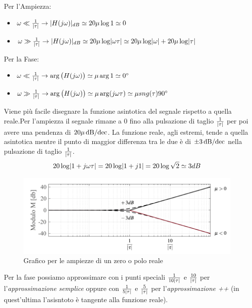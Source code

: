 Per l'Ampiezza:
\begin{itemize}
	\item $ \omega \ll \frac{1}{\abs{\tau}} \rightarrow \abs{H(j\omega)}_{dB} \simeq 20\mu \log 1 \simeq 0 $
	\item $ \omega \gg \frac{1}{\abs{\tau}} \rightarrow \abs{H(j\omega)}_{dB} \simeq 20\mu \log \abs{\omega\tau} \simeq 20 \mu \log \abs{\omega} +20 \mu \log \abs{\tau} $
\end{itemize}

Per la Fase:
\begin{itemize}
	\item $ \omega \ll \frac{1}{\abs{\tau}} \rightarrow \arg \big(H(j\omega)\big) \simeq \mu \arg 1 \simeq \ang{0} $ 
	\item $ \omega \gg \frac{1}{\abs{\tau}} \rightarrow \arg \big(H(j\omega)\big) \simeq \mu \arg (j\omega\tau) \simeq \mu \sng(\tau)\ang{90} $ 
\end{itemize}

Viene più facile disegnare la funzione asintotica del segnale rispetto a quella reale.Per l'ampiezza il segnale rimane a $ 0 $ fino alla pulsazione di taglio $ \frac{1}{\abs{\tau}} $ per poi avere una pendenza di $ 20 \mu \dbdec $. La funzione reale, agli estremi, tende a quella asintotica mentre il punto di maggior differenza tra le due è di $ \pm 3 \dbdec $ nella pulsazione di taglio $ \frac{1}{\abs{\tau}} $.
\[ 20\log \abs{1+j\omega\tau} = 20\log \abs{1+j1} = 20\log \sqrt{2} \simeq 3 dB \] 

\begin{figure}[H]
	\centering
	\includegraphics[width=0.7\linewidth]{immagini/cap6_Bode/bodeZPR-Amp.pdf}
	\caption{Grafico per le ampiezze di un zero o polo reale}
	\label{fig:bodezpr-amp}
\end{figure}

Per la fase possiamo approssimare con i punti speciali $ \frac{1}{10\abs{\tau}} $ e $ \frac{10}{\abs{\tau}} $ per l'\emph{approssimazione semplice} oppure con $ \frac{1}{5\abs{\tau}} $ e $ \frac{5}{\abs{\tau}} $ per l'\emph{approssimazione ++} (in quest'ultima l'asisntoto è tangente alla funzione reale).

